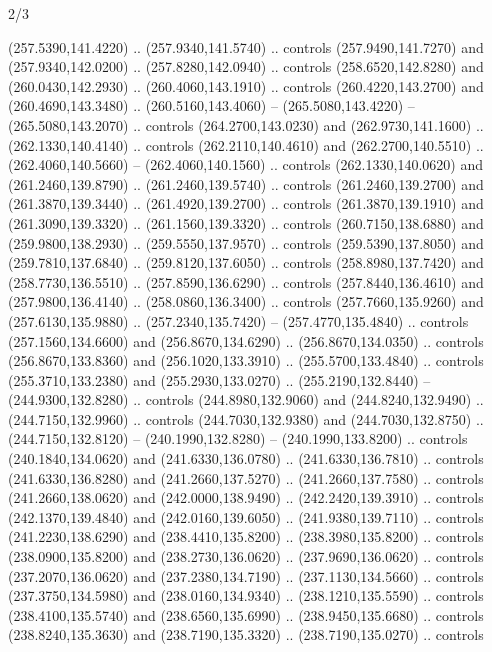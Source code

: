 \begin{flagdescription}{2/3}
\begin{scope}[xshift=0.5\flaglength,yshift=0.5\flagwidth,scale=\flagwidth/259.2]
\begin{scope}[y=0.8pt, x=0.8pt, yscale=-1,shift={(-243,-162)}]
      (257.5390,141.4220) .. (257.9340,141.5740) .. controls (257.9490,141.7270) and
      (257.9340,142.0200) .. (257.8280,142.0940) .. controls (258.6520,142.8280) and
      (260.0430,142.2930) .. (260.4060,143.1910) .. controls (260.4220,143.2700) and
      (260.4690,143.3480) .. (260.5160,143.4060) -- (265.5080,143.4220) --
      (265.5080,143.2070) .. controls (264.2700,143.0230) and (262.9730,141.1600) ..
      (262.1330,140.4140) .. controls (262.2110,140.4610) and (262.2700,140.5510) ..
      (262.4060,140.5660) -- (262.4060,140.1560) .. controls (262.1330,140.0620) and
      (261.2460,139.8790) .. (261.2460,139.5740) .. controls (261.2460,139.2700) and
      (261.3870,139.3440) .. (261.4920,139.2700) .. controls (261.3870,139.1910) and
      (261.3090,139.3320) .. (261.1560,139.3320) .. controls (260.7150,138.6880) and
      (259.9800,138.2930) .. (259.5550,137.9570) .. controls (259.5390,137.8050) and
      (259.7810,137.6840) .. (259.8120,137.6050) .. controls (258.8980,137.7420) and
      (258.7730,136.5510) .. (257.8590,136.6290) .. controls (257.8440,136.4610) and
      (257.9800,136.4140) .. (258.0860,136.3400) .. controls (257.7660,135.9260) and
      (257.6130,135.9880) .. (257.2340,135.7420) -- (257.4770,135.4840) .. controls
      (257.1560,134.6600) and (256.8670,134.6290) .. (256.8670,134.0350) .. controls
      (256.8670,133.8360) and (256.1020,133.3910) .. (255.5700,133.4840) .. controls
      (255.3710,133.2380) and (255.2930,133.0270) .. (255.2190,132.8440) --
      (244.9300,132.8280) .. controls (244.8980,132.9060) and (244.8240,132.9490) ..
      (244.7150,132.9960) .. controls (244.7030,132.9380) and (244.7030,132.8750) ..
      (244.7150,132.8120) -- (240.1990,132.8280) -- (240.1990,133.8200) .. controls
      (240.1840,134.0620) and (241.6330,136.0780) .. (241.6330,136.7810) .. controls
      (241.6330,136.8280) and (241.2660,137.5270) .. (241.2660,137.7580) .. controls
      (241.2660,138.0620) and (242.0000,138.9490) .. (242.2420,139.3910) .. controls
      (242.1370,139.4840) and (242.0160,139.6050) .. (241.9380,139.7110) .. controls
      (241.2230,138.6290) and (238.4410,135.8200) .. (238.3980,135.8200) .. controls
      (238.0900,135.8200) and (238.2730,136.0620) .. (237.9690,136.0620) .. controls
      (237.2070,136.0620) and (237.2380,134.7190) .. (237.1130,134.5660) .. controls
      (237.3750,134.5980) and (238.0160,134.9340) .. (238.1210,135.5590) .. controls
      (238.4100,135.5740) and (238.6560,135.6990) .. (238.9450,135.6680) .. controls
      (238.8240,135.3630) and (238.7190,135.3320) .. (238.7190,135.0270) .. controls

\end{scope}
\end{scope}
\end{flagdescription}
